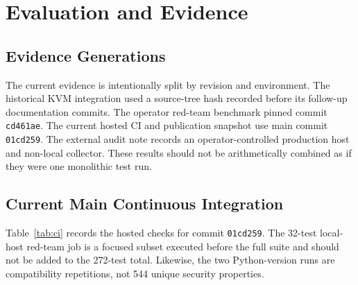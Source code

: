 \documentclass[journal]{IEEEtran}
\newcommand{\mainshort}{\texttt{01cd259}}
\newcommand{\benchshort}{\texttt{cd461ae}}
\begin{document}
\section{Evaluation and Evidence}
\subsection{Evidence Generations}
The current evidence is intentionally split by revision and environment. The historical KVM integration used a source-tree hash recorded before its follow-up documentation commits. The operator red-team benchmark pinned commit \benchshort. The current hosted CI and publication snapshot use main commit \mainshort. The external audit note records an operator-controlled production host and non-local collector. These results should not be arithmetically combined as if they were one monolithic test run.

\subsection{Current Main Continuous Integration}
Table~\ref{tab:ci} records the hosted checks for commit \mainshort. The 32-test local-host red-team job is a focused subset executed before the full suite and should not be added to the 272-test total. Likewise, the two Python-version runs are compatibility repetitions, not 544 unique security properties.
\end{document}
